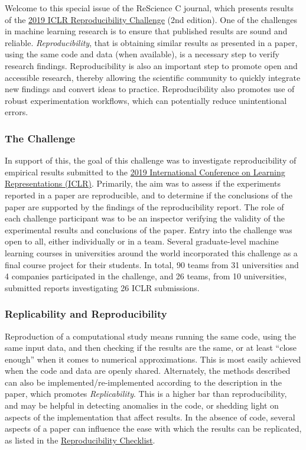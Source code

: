 Welcome to this special issue of the ReScience C journal, which presents results of the \href{https://reproducibility-challenge.github.io/iclr_2019/}{2019 ICLR Reproducibility Challenge} (2nd edition). One of the challenges in machine learning research is to ensure that published results are sound and reliable. \textit{Reproducibility}, that is obtaining similar results as presented in a paper, using the same code and data (when available), is a necessary step to verify research findings. Reproducibility is also an important step to promote open and accessible research, thereby allowing the scientific community to quickly integrate new findings and convert ideas to practice.  Reproducibility also promotes use of robust experimentation workflows, which can potentially reduce unintentional errors.

\subsubsection{The Challenge} 

In support of this, the goal of this challenge was to investigate reproducibility of empirical results submitted to the \href{https://iclr.cc/}{2019 International Conference on Learning Representations (ICLR)}. Primarily, the aim was to assess if the experiments reported in a paper are reproducible, and to determine if the conclusions of the paper are supported by the findings of the reproducibility report. The role of each challenge participant was to be an inspector verifying the validity of the experimental results and conclusions of the paper.  Entry into the challenge was open to all, either individually or in a team.  Several graduate-level machine learning courses in universities around the world incorporated this challenge as a final course project for their students.   In total, 90 teams from 31 universities and 4 companies participated in the challenge, and 26 teams, from 10 universities, submitted reports investigating 26 ICLR submissions.

\subsubsection{Replicability and Reproducibility} 

Reproduction of a computational study means running the same code, using the same input data, and then checking if the results are the same, or at least “close enough” when it comes to numerical approximations. This is most easily achieved when the code and data are openly shared.  Alternately, the methods described can also be implemented/re-implemented according to the description in the paper, which promotes \textit{Replicability}. This is a higher bar than reproducibility, and may be helpful in detecting anomalies in the code, or shedding light on aspects of the implementation that affect results.  In the absence of code, several aspects of a paper can influence the ease with which the results can be replicated, as listed in the \href{https://www.cs.mcgill.ca/~jpineau/ReproducibilityChecklist.pdf}{Reproducibility Checklist}. 

